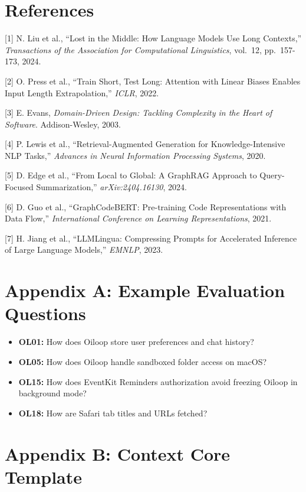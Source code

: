 \documentclass[11pt]{article}
\providecommand{\tightlist}{%
  \setlength{\itemsep}{2pt}%
  \setlength{\parskip}{0pt}%
}
\begin{document}
\section{References}\label{references}

{[}1{]} N. Liu et al., ``Lost in the Middle: How Language Models Use
Long Contexts,'' \emph{Transactions of the Association for Computational
Linguistics}, vol.~12, pp.~157-173, 2024.

{[}2{]} O. Press et al., ``Train Short, Test Long: Attention with Linear
Biases Enables Input Length Extrapolation,'' \emph{ICLR}, 2022.

{[}3{]} E. Evans, \emph{Domain-Driven Design: Tackling Complexity in the
Heart of Software}. Addison-Wesley, 2003.

{[}4{]} P. Lewis et al., ``Retrieval-Augmented Generation for
Knowledge-Intensive NLP Tasks,'' \emph{Advances in Neural Information
Processing Systems}, 2020.

{[}5{]} D. Edge et al., ``From Local to Global: A GraphRAG Approach to
Query-Focused Summarization,'' \emph{arXiv:2404.16130}, 2024.

{[}6{]} D. Guo et al., ``GraphCodeBERT: Pre-training Code
Representations with Data Flow,'' \emph{International Conference on
Learning Representations}, 2021.

{[}7{]} H. Jiang et al., ``LLMLingua: Compressing Prompts for
Accelerated Inference of Large Language Models,'' \emph{EMNLP}, 2023.

\section{Appendix A: Example Evaluation
Questions}\label{appendix-a-example-evaluation-questions}

\begin{itemize}
\tightlist
\item
  \textbf{OL01:} How does Oiloop store user preferences and chat
  history?
\item
  \textbf{OL05:} How does Oiloop handle sandboxed folder access on
  macOS?
\item
  \textbf{OL15:} How does EventKit Reminders authorization avoid
  freezing Oiloop in background mode?
\item
  \textbf{OL18:} How are Safari tab titles and URLs fetched?
\end{itemize}

\section{Appendix B: Context Core
Template}\label{appendix-b-context-core-template}
\end{document}
